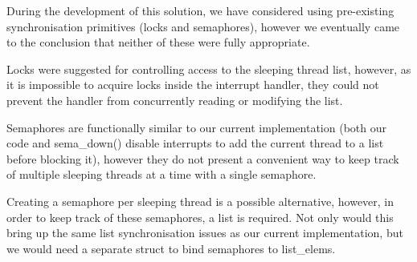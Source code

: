 \documentclass[11pt]{article}
\begin{document}
During the development of this solution, we have considered using pre-existing synchronisation primitives (locks and semaphores), however we eventually came to the conclusion that neither of these were fully appropriate.

Locks were suggested for controlling access to the sleeping thread list, however, as it is impossible to acquire locks inside the interrupt handler, they could not prevent the handler from concurrently reading or modifying the list.

Semaphores are functionally similar to our current implementation (both our code and sema\_down() disable interrupts to add the current thread to a list before blocking it), however they do not present a convenient way to keep track of multiple sleeping threads at a time with a single semaphore.

Creating a semaphore per sleeping thread is a possible alternative, however, in order to keep track of these semaphores, a list is required. Not only would this bring up the same list synchronisation issues as our current implementation, but we would need a separate struct to bind semaphores to list\_elems.
\end{document}
